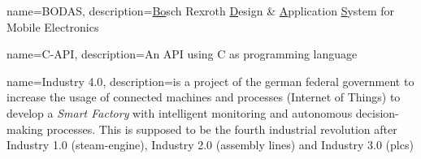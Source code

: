 %
% 
%
%
%
%


{
    name={BODAS}, 
    description={\underline{Bo}sch Rexroth \underline{D}esign \& \underline{A}pplication \underline{S}ystem for Mobile Electronics}
}




{
    name={C-API}, 
    description={An API using C as programming language}
}


{
    name={Industry 4.0},
    description={is a project of the german federal government to increase the usage of connected machines and processes (Internet of Things) to develop a \textit{Smart Factory} with intelligent monitoring and autonomous decision-making processes. This is supposed to be the fourth industrial revolution after Industry 1.0 (steam-engine), Industry 2.0 (assembly lines) and Industry 3.0 (\glspl{plc})} \cite{Indu4}
}


